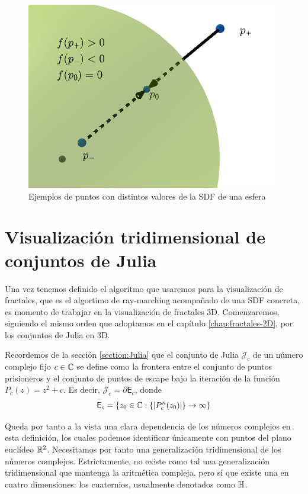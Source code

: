 \begin{figure} [ht]
    \centering
    \includegraphics[scale = 0.5]{img/C8/SDF-esfera.png}
    \caption{Ejemplos de puntos con distintos valores de la SDF de una esfera}
    \label{fig:SDF-esfera}
\end{figure}

\section{Visualización tridimensional de conjuntos de Julia}

Una vez tenemos definido el algoritmo que usaremos para la visualización de fractales, que es el algortimo de ray-marching acompañado de una SDF concreta, es momento de trabajar en la visualización de fractales 3D. Comenzaremos, siguiendo el mismo orden que adoptamos en el capítulo \ref{chap:fractales-2D}, por los conjuntos de Julia en 3D.

Recordemos de la sección \ref{section:Julia} que el conjunto de Julia $\mathcal{J}_c$ de un número complejo fijo $c\in\mathbb{C}$ se define como la frontera entre el conjunto de puntos prisioneros y el conjunto de puntos de escape bajo la iteración de la función $P_{c}(z)=z^2+c$. Es decir, $\mathcal{J}_c = \partial \mathsf{E}_c$, donde
\begin{equation}
    \mathsf{E}_c = \{z_0\in\mathbb{C}: \{|P_c^n(z_0)|\}\rightarrow \infty \}
\end{equation}

Queda por tanto a la vista una clara dependencia de los números complejos en esta definición, los cuales podemos identificar únicamente con puntos del plano euclídeo $\mathbb{R}^2$. Necesitamos por tanto una generalización tridimensional de los números complejos. Estrictamente, no existe como tal una generalización tridimensional que mantenga la aritmética compleja, pero sí que existe una en cuatro dimensiones: los cuaternios, usualmente denotados como $\mathbb{H}$.

